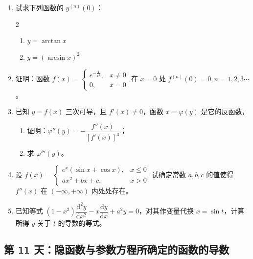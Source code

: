 \begin{enumerate}[label=\textbf{\arabic*.}, itemsep=5.2cm]
    \item 试求下列函数的 $y^{(n)}(0)$：
    \begin{multicols}{2}
        \begin{enumerate}[label=(\arabic*)]
            \item $y = \arctan x$
            \item $y = (\arcsin x)^2$
        \end{enumerate}
    \end{multicols}

\newpage

    \item 证明：函数 $f(x) = \begin{cases} e^{-\frac{1}{x^2}}, & x \neq 0 \\ 0, & x = 0 \end{cases}$ 在 $x=0$ 处 $f^{(n)}(0) = 0, n=1, 2, 3 \cdots$。
\vspace{6em}
    \item 已知 $y = f(x)$ 三次可导，且 $f'(x) \neq 0$，函数 $x = \varphi(y)$ 是它的反函数，
    \begin{enumerate}[label=(\arabic*)]
        \item 证明：$\varphi''(y) = -\dfrac{f''(x)}{[f'(x)]^3}$；
        \item 求 $\varphi'''(y)$。
    \end{enumerate}
\vspace{6em}
\newpage
    \item 设 $f(x) = \begin{cases} e^x (\sin x + \cos x), & x \le 0 \\ ax^2 + bx + c, & x > 0 \end{cases}$ 试确定常数 $a, b, c$ 的值使得 $f''(x)$ 在 $(-\infty, +\infty)$ 内处处存在。
\vspace{6em}
    \item 已知等式 $(1 - x^2) \dfrac{\mathrm{d}^2 y}{\mathrm{d} x^2} - x \dfrac{\mathrm{d} y}{\mathrm{d} x} + a^2 y = 0$，对其作变量代换 $x = \sin t$，计算所得 $y$ 关于 $t$ 的导数的等式。
\end{enumerate}

\newpage
\subsection*{第 11 天：隐函数与参数方程所确定的函数的导数}

